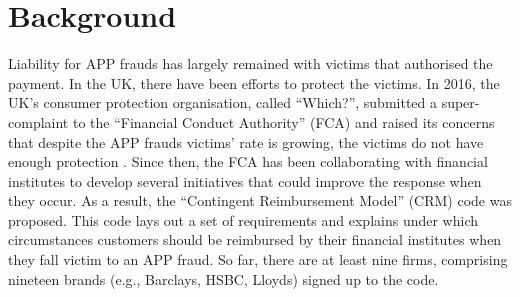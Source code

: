 
\section{Background}\label{sec::background}



Liability for  APP frauds has largely remained with  victims  that authorised the payment.  In the UK,  there have been  efforts  to protect the victims. In  2016, the UK's consumer protection organisation, called ``Which?'', submitted a super-complaint to the
 ``Financial Conduct Authority” (FCA) and  raised its concerns that despite the APP frauds victims' rate is  growing, the victims do not have enough protection \cite{Which?-super-complaint}.  Since then, the FCA has been collaborating with financial institutes  to develop several initiatives that
could  improve the response when they  occur. As a result,  the ``Contingent Reimbursement Model'' (CRM)  code  \cite{CRM-code} was proposed. This code  lays out a set of requirements and explains under which circumstances customers should be reimbursed by their  financial institutes when they fall victim to an APP fraud. So far,  there are at least nine firms, comprising nineteen brands (e.g., Barclays, HSBC,  Lloyds) signed up to the  code. 


